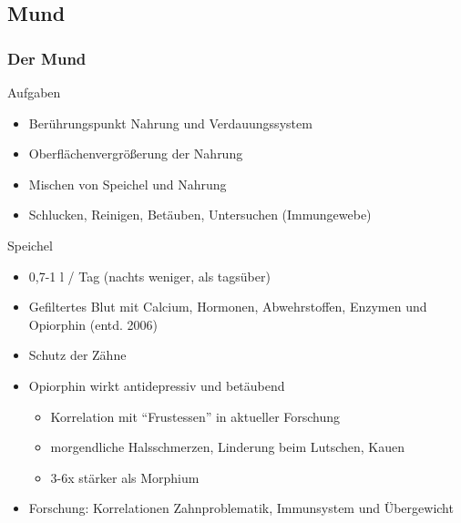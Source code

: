\documentclass[xcolor=dvipsnames]{beamer}
\begin{document}
    \subsection{Mund}
    \begin{frame}[allowframebreaks]
        \frametitle{Der Mund}

        \begin{block}{Aufgaben}
            \begin{itemize}
                \setlength\itemsep{1em}
                \item Berührungspunkt Nahrung und Verdauungssystem
                \item Oberflächenvergrößerung der Nahrung
                \item Mischen von Speichel und Nahrung
                \item Schlucken, Reinigen, Betäuben, Untersuchen (Immungewebe)
            \end{itemize}
        \end{block}

        \framebreak

        \begin{block}{Speichel}
            \begin{itemize}
                \setlength\itemsep{1em}
                \item 0,7-1 l / Tag (nachts weniger, als tagsüber)
                \item Gefiltertes Blut mit Calcium, Hormonen, Abwehrstoffen, Enzymen und Opiorphin (entd. 2006)
                \item Schutz der Zähne
                \item Opiorphin wirkt antidepressiv und betäubend
                \begin{itemize}
                    \item Korrelation mit "`Frustessen"' in aktueller Forschung
                    \item morgendliche Halsschmerzen, Linderung beim Lutschen, Kauen
                    \item 3-6x stärker als Morphium
                \end{itemize}
                \item Forschung: Korrelationen Zahnproblematik, Immunsystem und Übergewicht
            \end{itemize}
        \end{block}

        \framebreak


\end{frame}
\end{document}
